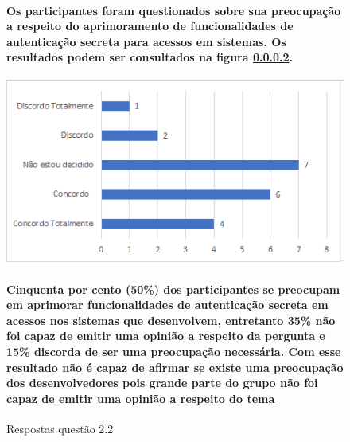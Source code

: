 \begin{figure}[!t]
\centering
\paragraph{Os participantes foram questionados sobre sua preocupação a respeito do aprimoramento de funcionalidades de autenticação secreta para acessos em sistemas. Os resultados podem ser consultados na figura \ref{fig:2.2}.}
\includegraphics[scale=0.7]{figuras das questoes/2.2.png}
\caption{Respostas questão 2.2}
\paragraph{Cinquenta por cento (50{\%}) dos participantes se preocupam em aprimorar funcionalidades de autenticação secreta em acessos nos sistemas que desenvolvem, entretanto 35{\%} não foi capaz de emitir uma opinião a respeito da pergunta e 15{\%} discorda de ser uma preocupação necessária. Com esse resultado não é capaz de afirmar se existe uma preocupação dos desenvolvedores pois grande parte do grupo não foi capaz de emitir uma opinião a respeito do tema}
\label{fig:2.2}
\end{figure}
